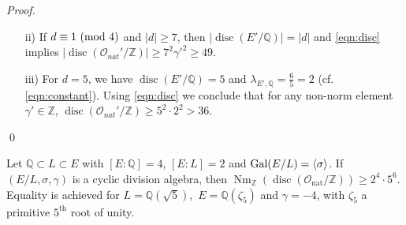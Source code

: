 \documentclass[smallextended]{svjour3}
\def\zmod#1{\,\,({\rm mod}\,\,#1)}
\newcommand{\Q}{\mathbb{Q}}
\newcommand{\Z}{\mathbb{Z}}
\newcommand{\G}{{\rm Gal}}
\newcommand{\Or}{\mathcal{O}}
\DeclareMathOperator{\Nm}{Nm}
\DeclareMathOperator{\nat}{nat}
\DeclareMathOperator{\disc}{disc}
\begin{document}
\begin{proof}
\begin{itemize}
	\item[ii)] If $d\equiv 1 \zmod 4$ and $|d|\ge 7$, then $\left|\disc(E'/\Q)\right| = |d|$ and \eqref{eqn:disc} implies $|\disc (\Or_{nat}'/\Z)|\ge 7^2\gamma'^2\ge 49$. 

	\item[iii)] For $d = 5$,  we have $\disc(E'/\Q) = 5$ and $\lambda_{E', \Q} = \frac{6}{5} = 2$ (cf. \eqref{eqn:constant}). Using \eqref{eqn:disc} we conclude that for any non-norm element $\gamma' \in \Z$, $\disc(\Or_{nat}'/\Z)\ge 5^2\cdot 2^2>36$.
\end{itemize} \qed
\end{proof}

\begin{theorem}
\label{thm:res2}
Let $\Q \subset L \subset E$ with $[E:\Q] = 4$, $[E:L] = 2$ and $\G(E/L)=\langle \sigma \rangle$. If $\left( E/L, \sigma, \gamma\right)$ is a cyclic division algebra, then $\Nm_\Z(\disc(\Or_{\nat}/\Z)) \ge 2^4\cdot 5^6$. Equality is achieved for $L = \Q(\sqrt{5}),$ $E = \Q(\zeta_5)$ and $\gamma = -4$, with $\zeta_5$ a primitive $5^\text{th}$ root of unity. 

\end{theorem}
  
\end{document}
